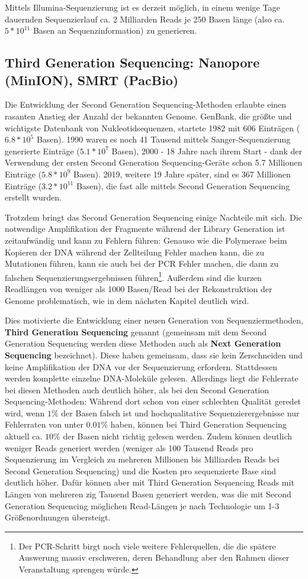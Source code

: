 Mittels Illumina-Sequenzierung ist es derzeit möglich, in einem wenige Tage dauernden Sequenzierlauf ca. 2 Milliarden Reads je 250 Basen länge (also ca. $5*10^{11}$ Basen an Sequenzinformation) zu generieren.

\subsection{Third Generation Sequencing: Nanopore (MinION), SMRT (PacBio)}

Die Entwicklung der Second Generation Sequencing-Methoden erlaubte einen rasanten Anstieg der Anzahl der bekannten Genome. GenBank, die größte und wichtigste Datenbank von Nukleotidsequenzen, startete 1982 mit 606 Einträgen ($6.8 * 10^5$ Basen). 1990 waren es noch 41 Tausend mittels Sanger-Sequenzierung generierte Einträge ($5.1*10^7$ Basen), 2000 - 18 Jahre nach ihrem Start - dank der Verwendung der ersten Second Generation Sequencing-Geräte schon 5.7 Millionen Einträge ($5.8 * 10^9$ Basen). 2019, weitere 19 Jahre später, sind es 367 Millionen Einträge ($3.2 * 10^{11}$ Basen), die fast alle mittels Second Generation Sequencing erstellt wurden. 

Trotzdem bringt das Second Generation Sequencing einige Nachteile mit sich. Die notwendige Amplifikation der Fragmente während der Library Generation ist zeitaufwändig und kann zu Fehlern führen: Genauso wie die Polymerase beim Kopieren der DNA während der Zellteilung Fehler machen kann, die zu Mutationen führen, kann sie auch bei der PCR Fehler machen, die dann zu falschen Sequenzierungsergebnissen führen\footnote{Der PCR-Schritt birgt noch viele weitere Fehlerquellen, die die spätere Auswerung massiv erschweren, deren Behandlung aber den Rahmen dieser Veranstaltung sprengen würde.}. Außerdem sind die kurzen Readlängen von weniger als 1000 Basen/Read bei der Rekonstruktion der Genome problematisch, wie in dem nächsten Kapitel deutlich wird.

Dies motivierte die Entwicklung einer neuen Generation von Sequenziermethoden, \textbf{Third Generation Sequencing} genannt (gemeinsam mit dem Second Generation Sequencing werden diese Methoden auch als \textbf{Next Generation Sequencing} bezeichnet). Diese haben gemeinsam, dass sie kein Zerschneiden und keine Amplifikation der DNA vor der Sequenzierung erfordern. Stattdessen werden komplette einzelne DNA-Moleküle gelesen. Allerdings liegt die Fehlerrate bei diesen Methoden auch deutlich höher, als bei den Second Generation Sequencing-Methoden: Während dort schon von einer schlechten Qualität geredet wird, wenn $1\%$ der Basen falsch ist und hochqualitative Sequenzierergebnisse nur Fehlerraten von unter $0.01\%$ haben, können bei Third Generation Sequencing aktuell ca. $10\%$ der Basen nicht richtig gelesen werden. Zudem können deutlich weniger Reads generiert werden (weniger als 100 Tausend Reads pro Sequenzierung im Vergleich zu mehreren Millionen bis Milliarden Reads bei Second Generation Sequencing) und die Kosten pro sequenzierte Base sind deutlich höher. Dafür können aber mit Third Generation Sequencing Reads mit Längen von mehreren zig Tausend Basen generiert werden, was die mit Second Generation Sequencing möglichen Read-Längen je nach Technologie um 1-3 Größenordnungen übersteigt. 

